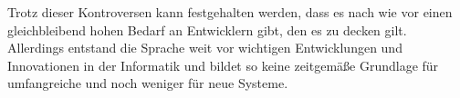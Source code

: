 Trotz dieser Kontroversen kann festgehalten werden, dass es nach wie vor einen gleichbleibend hohen Bedarf an Entwicklern gibt, den es zu decken gilt. Allerdings entstand die Sprache weit vor wichtigen Entwicklungen und Innovationen in der Informatik und bildet so keine zeitgemäße Grundlage für umfangreiche und noch weniger für neue Systeme.


